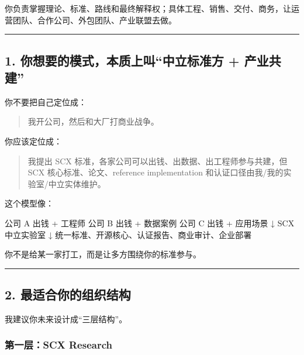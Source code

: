\documentclass[
  12pt,
]{ctexart}
\newenvironment{Shaded}{}{}
\newcommand{\NormalTok}[1]{#1}
\begin{document}
你负责掌握理论、标准、路线和最终解释权；具体工程、销售、交付、商务，让运营团队、合作公司、外包团队、产业联盟去做。

\begin{center}\rule{0.5\linewidth}{0.5pt}\end{center}

\subsection{1. 你想要的模式，本质上叫``中立标准方 +
产业共建''}\label{ux4f60ux60f3ux8981ux7684ux6a21ux5f0fux672cux8d28ux4e0aux53ebux4e2dux7acbux6807ux51c6ux65b9-ux4ea7ux4e1aux5171ux5efa}

你不要把自己定位成：

\begin{quote}
我开公司，然后和大厂打商业战争。
\end{quote}

你应该定位成：

\begin{quote}
我提出 SCX 标准，各家公司可以出钱、出数据、出工程师参与共建，但 SCX
核心标准、论文、reference implementation
和认证口径由我/我的实验室/中立实体维护。
\end{quote}

这个模型像：

\begin{Shaded}
\begin{Highlighting}[]
\NormalTok{公司 A 出钱 + 工程师}
\NormalTok{公司 B 出钱 + 数据案例}
\NormalTok{公司 C 出钱 + 应用场景}
\NormalTok{        ↓}
\NormalTok{    SCX 中立实验室}
\NormalTok{        ↓}
\NormalTok{统一标准、开源核心、认证报告、商业审计、企业部署}
\end{Highlighting}
\end{Shaded}

你不是给某一家打工，而是让多方围绕你的标准参与。

\begin{center}\rule{0.5\linewidth}{0.5pt}\end{center}

\subsection{2.
最适合你的组织结构}\label{ux6700ux9002ux5408ux4f60ux7684ux7ec4ux7ec7ux7ed3ux6784}

我建议你未来设计成``三层结构''。

\subsubsection{第一层：SCX
Research}\label{ux7b2cux4e00ux5c42scx-research}
\end{document}
